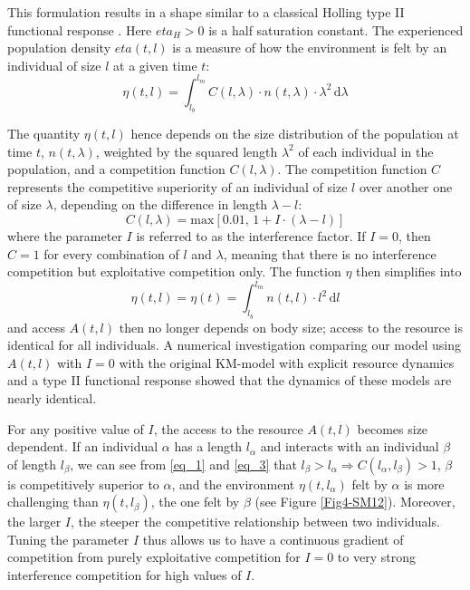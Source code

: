 This formulation results in a shape similar to a classical Holling type II
functional response \autocites{holling1965a}. Here $eta_H>0$ is a half 
saturation constant. The experienced population density $eta(t,l)$ is a measure
of how the environment is felt by an individual of size $l$ at a given time $t$:
\begin{equation}
\label{eq_2}
\eta(t,l)=\int_{l_b}^{l_m} \! C(l,\lambda)\cdot n(t,\lambda)\cdot\lambda^2\, \mathrm{d}\lambda
\end{equation}

The quantity $\eta(t,l)$ hence depends on the size distribution of the
population at time $t$, $n(t,\lambda)$, weighted by the squared length
$\lambda^2$ of each individual in the population, and a competition function
$C(l,\lambda)$. The competition function $C$ represents the competitive
superiority of an individual of size $l$ over another one of size $\lambda$,
depending on the difference in length $\lambda-l$:
\begin{equation}
\label{eq_3}
C(l,\lambda) = \mathrm{max}\left[ 0.01,\, 1+I\cdot(\lambda-l) \right]
\end{equation}
where the parameter $I$ is referred to as the interference factor. If $I=0$,
then $C=1$ for every combination of $l$ and $\lambda$, meaning that there is no
interference competition but exploitative competition only. The function $\eta$
then simplifies into
\begin{equation}
\label{eq_4}
\eta (t,l) = \eta(t) = \int_{l_b}^{l_m} \! n(t,l)\cdot l^2\, \mathrm{d}l
\end{equation}
and access $A(t,l)$ then no longer depends on body size; access to the resource
is identical for all individuals. A numerical investigation comparing our model
using $A(t,l)$ with $I=0$ with the original KM-model with explicit resource
dynamics and a type II functional response showed that the dynamics of these
models are nearly identical.

For any positive value of $I$, the access to the resource $A(t,l)$ becomes size
dependent. If an individual $\alpha$ has a length $l_{\alpha}$ and interacts
with an individual $\beta$ of length $l_{\beta}$, we can see from \eqref{eq_1}
and \eqref{eq_3} that $l_{\beta}>l_{\alpha} \Rightarrow
C(l_{\alpha},l_{\beta})>1$, $\beta$ is competitively superior to $\alpha$, and
the environment $\eta(t,l_{\alpha})$ felt by $\alpha$ is more challenging than
$\eta(t,l_{\beta})$, the one felt by $\beta$ (see Figure \ref{Fig4-SM12}).
Moreover, the larger $I$, the steeper the competitive relationship between two
individuals. Tuning the parameter $I$ thus allows us to have a continuous
gradient of competition from purely exploitative competition for $I=0$ to very
strong interference competition for high values of $I$.

